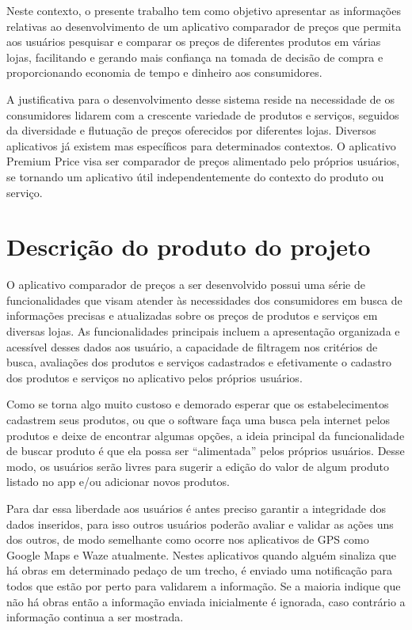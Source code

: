 Neste contexto, o presente trabalho tem como objetivo apresentar as informações relativas ao desenvolvimento de um aplicativo comparador de preços que permita aos usuários pesquisar e comparar os preços de diferentes produtos em várias lojas, facilitando e gerando mais confiança na tomada de decisão de compra e proporcionando economia de tempo e dinheiro aos consumidores.

A justificativa para o desenvolvimento desse sistema reside na necessidade de os consumidores lidarem com a crescente variedade de produtos e serviços, seguidos da diversidade e flutuação de preços oferecidos por diferentes lojas. Diversos aplicativos já existem mas específicos para determinados contextos. O aplicativo Premium Price visa ser comparador de preços alimentado pelo próprios usuários, se tornando um aplicativo útil independentemente do contexto do produto ou serviço. 





\section{Descrição do produto do projeto} \label{sec:descricaoproduto}
O aplicativo comparador de preços a ser desenvolvido possui uma série de funcionalidades que visam atender às necessidades dos consumidores em busca de informações precisas e atualizadas sobre os preços de produtos e serviços em diversas lojas. As funcionalidades principais incluem a apresentação organizada e acessível desses dados aos usuário, a capacidade de filtragem nos critérios de busca, avaliações dos produtos e serviços cadastrados e efetivamente o cadastro dos produtos e serviços no aplicativo pelos próprios usuários.

Como se torna algo muito custoso e demorado esperar que os estabelecimentos cadastrem seus produtos, ou que o software faça uma busca pela internet pelos produtos e deixe de encontrar algumas opções, a ideia principal da funcionalidade de buscar produto é que ela possa ser ``alimentada'' pelos próprios usuários. Desse modo, os usuários serão livres para sugerir a edição do valor de algum produto listado no app e/ou adicionar novos produtos. 

Para dar essa liberdade aos usuários é antes preciso garantir a integridade dos dados inseridos, para isso outros usuários poderão avaliar e validar as ações uns dos outros, de modo semelhante como ocorre nos aplicativos de GPS como Google Maps e Waze atualmente. Nestes aplicativos quando alguém sinaliza que há obras em determinado pedaço de um trecho, é enviado uma notificação para todos que estão por perto para validarem a informação. Se a maioria indique que não há obras então a informação enviada inicialmente é ignorada, caso contrário a informação continua a ser mostrada.

